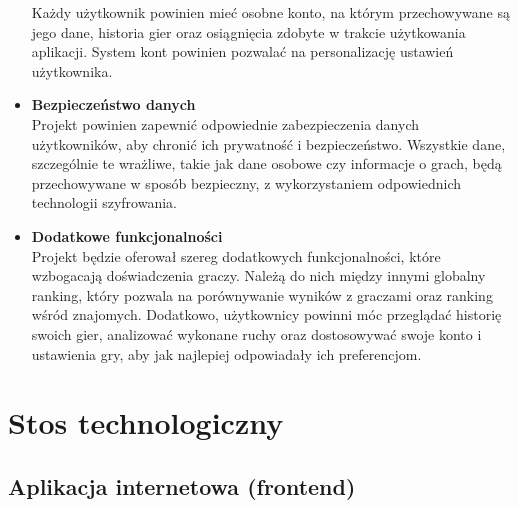 \documentclass[12pt,a4paper]{article}
\begin{document}
\begin{itemize}
    Każdy użytkownik powinien mieć osobne konto, na którym przechowywane są jego dane, historia gier oraz osiągnięcia zdobyte w trakcie użytkowania aplikacji. System kont powinien pozwalać na personalizację ustawień użytkownika.
    \item \textbf{Bezpieczeństwo danych}\\
    Projekt powinien zapewnić odpowiednie zabezpieczenia danych użytkowników, aby chronić ich prywatność i bezpieczeństwo. Wszystkie dane, szczególnie te wrażliwe, takie jak dane osobowe czy informacje o grach, będą przechowywane w sposób bezpieczny, z wykorzystaniem odpowiednich technologii szyfrowania.
    \item \textbf{Dodatkowe funkcjonalności}\\
    Projekt będzie oferował szereg dodatkowych funkcjonalności, które wzbogacają doświadczenia graczy. Należą do nich między innymi globalny ranking, który pozwala na porównywanie wyników z graczami oraz ranking wśród znajomych. Dodatkowo, użytkownicy powinni móc przeglądać historię swoich gier, analizować wykonane ruchy oraz dostosowywać swoje konto i ustawienia gry, aby jak najlepiej odpowiadały ich preferencjom.
\end{itemize}

\newpage

\section{Stos technologiczny}
\subsection{Aplikacja internetowa (frontend)}
\end{document}
